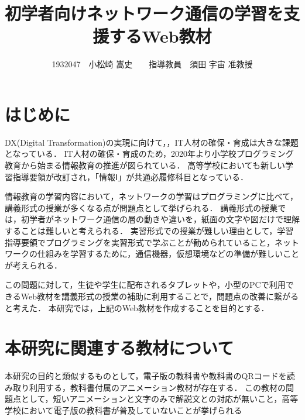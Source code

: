 \documentclass[twocolumn,10pt,a4j]{ltjsarticle}
\title{初学者向けネットワーク通信の学習を支援するWeb教材}
\author{1932047　小松崎 嵩史　　指導教員　須田 宇宙 准教授}
\date{}
\begin{document}
\maketitle

\section{はじめに}

DX(Digital Transformation)の実現に向けて，，IT人材の確保・育成は大きな課題となっている\cite{dx}．
IT人材の確保・育成のため，2020年より小学校プログラミング教育から始まる情報教育の推進が図られている．
高等学校においても新しい学習指導要領が改訂され，「情報Ⅰ」が共通必履修科目となっている．


情報教育の学習内容において，ネットワークの学習はプログラミングに比べて，講義形式の授業が多くなる点が問題点として挙げられる．
講義形式の授業では，初学者がネットワーク通信の層の動きや違いを，紙面の文字や図だけで理解することは難しいと考えられる．
実習形式での授業が難しい理由として，学習指導要領でプログラミングを実習形式で学ぶことが勧められていること\cite{koukou_sidou}，ネットワークの仕組みを学習するために，通信機器，仮想環境などの準備が難しいことが考えられる．

この問題に対して，生徒や学生に配布されるタブレットや，小型のPCで利用できるWeb教材を講義形式の授業の補助に利用することで，問題点の改善に繋がると考えた．
本研究では，上記のWeb教材を作成することを目的とする．

\section{本研究に関連する教材について}
本研究の目的と類似するものとして，電子版の教科書や教科書のQRコードを読み取り利用する，教科書付属のアニメーション教材が存在する．
この教材の問題点として，短いアニメーションと文字のみで解説文との対応が無いこと，高等学校において電子版の教科書が普及していないことが挙げられる
\end{document}
